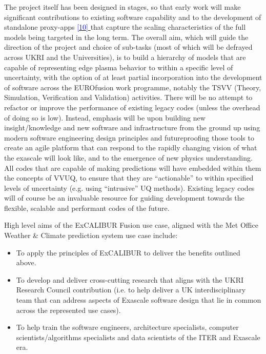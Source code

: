 \documentclass[a4paper]{article}
\newcommand\textstyleInternetlink[1]{\textcolor{blue}{#1}}
\newcommand\liststyleWWNumvii{%
\renewcommand\labelitemi{[F0B7?]}
\renewcommand\labelitemii{o}
\renewcommand\labelitemiii{[F0A7?]}
\renewcommand\labelitemiv{[F0B7?]}
}
\begin{document}
The project itself has been designed in stages, so that early work will make 
significant contributions to existing
software capability and to the development of standalone proxy-apps{
}\href{https://proxyapps.exascaleproject.org/app/}{\textstyleInternetlink{{[10]}
}}{
that capture the }scaling characteristics of the full models being targeted in 
the long term. The overall aim, which
will guide the direction of the project and choice of sub-tasks (most of which 
will be defrayed across UKRI and the
Universities), is to build a hierarchy of models that are capable of 
representing edge plasma behavior to within a
specific level of uncertainty, with the option of at least partial 
incorporation into the development of software
across the EUROfusion work programme, notably the TSVV (Theory, Simulation, 
Verification and Validation) activities.
There will be no attempt to refactor or improve the performance of existing 
legacy codes (unless the overhead of doing
so is low). Instead, emphasis will be upon building new insight/knowledge and 
new software and infrastructure from the
ground up using modern software engineering design principles and 
futureproofing those tools to create an agile
platform that can respond to the rapidly changing vision of what the exascale 
will look like, and to the emergence of
new physics understanding. All codes that are capable of making predictions 
will have embedded within them the concepts
of VVUQ, to ensure that they are ``actionable'' to within specified levels of 
uncertainty (e.g. using ``intrusive'' UQ
methods). Existing legacy codes will of course be an invaluable resource for 
guiding development towards the flexible,
scalable and performant codes of the future.


\bigskip

High level aims of the ExCALIBUR Fusion use case, aligned with the Met Office 
Weather \& Climate prediction system use
case include:


\bigskip

\liststyleWWNumvii
\begin{itemize}
\item To apply the principles of ExCALIBUR to deliver the benefits outlined 
above.
\item To develop and deliver cross-cutting research that aligns with the UKRI 
Research Council contribution (i.e. to
help deliver a UK interdisciplinary team that can address aspects of Exascale 
software design that lie in common across
the represented use cases).
\item To help train the software engineers, architecture specialists, computer 
scientists/algorithms specialists and
data scientists of the ITER and Exascale era.
\end{itemize}
\end{document}
